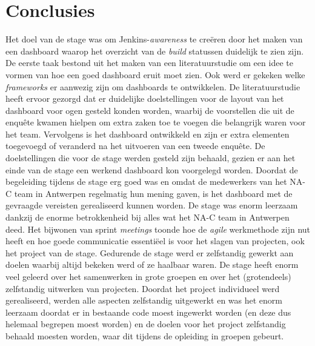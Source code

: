 \documentclass[10pt,a4paper]{article}
\begin{document}
\section{Conclusies}
\label{conclusies}
Het doel van de stage was om Jenkins-\textit{awareness} te cre\"eren door het maken van een dashboard waarop het overzicht van de \textit{build} statussen duidelijk te zien zijn. De eerste taak bestond uit het maken van een literatuurstudie om een idee te vormen van hoe een goed dashboard eruit moet zien. Ook werd er gekeken welke \textit{frameworks} er aanwezig zijn om dashboards te ontwikkelen. De literatuurstudie heeft ervoor gezorgd dat er duidelijke doelstellingen voor de layout van het dashboard voor ogen gesteld konden worden, waarbij de voorstellen die uit de enqu\^ete kwamen hielpen om extra zaken toe te voegen die belangrijk waren voor het team. Vervolgens is het dashboard ontwikkeld en zijn er extra elementen toegevoegd of veranderd na het uitvoeren van een tweede enqu\^ete. De doelstellingen die voor de stage werden gesteld zijn behaald, gezien er aan het einde van de stage een werkend dashboard kon voorgelegd worden. 
Doordat de begeleiding tijdens de stage erg goed was en omdat de medewerkers van het NA-C team in Antwerpen regelmatig hun mening gaven, is het dashboard met de gevraagde vereisten gerealiseerd kunnen worden.
De stage was enorm leerzaam dankzij de enorme betrokkenheid bij alles wat het NA-C team in Antwerpen deed. Het bijwonen van sprint \textit{meetings} toonde hoe de \textit{agile} werkmethode zijn nut heeft en hoe goede communicatie essenti\"eel is voor het slagen van projecten, ook het project van de stage.
Gedurende de stage werd er zelfstandig gewerkt aan doelen waarbij altijd bekeken werd of ze haalbaar waren.
De stage heeft enorm veel geleerd over het samenwerken in grote groepen en over het (grotendeels) zelfstandig uitwerken van projecten. Doordat het project individueel werd gerealiseerd, werden alle aspecten zelfstandig uitgewerkt en was het enorm leerzaam doordat er in bestaande code moest ingewerkt worden (en deze dus helemaal begrepen moest worden) en de doelen voor het project zelfstandig behaald moesten worden, waar dit tijdens de opleiding in groepen gebeurt.
\end{document}
